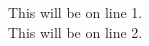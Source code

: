 \documentclass[a4paper,12pt]{article}
\begin{document}
	This will be on line 1.\\This will be on line 2.
	
\end{document}
